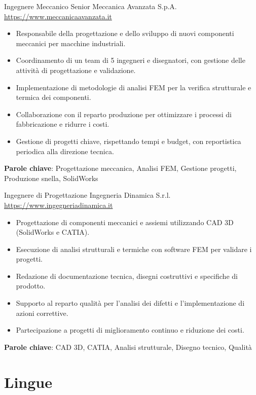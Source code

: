 \documentclass[a4paper, serif, 10pt]{moderncv}
\begin{document}
        {Ingegnere Meccanico Senior}
        {Meccanica Avanzata S.p.A.}
        {\url{https://www.meccanicaavanzata.it}}
        {}
        {\begin{itemize}
\item Responsabile della progettazione e dello sviluppo di nuovi componenti meccanici per macchine industriali.
\item Coordinamento di un team di 5 ingegneri e disegnatori, con gestione delle attività di progettazione e validazione.
\item Implementazione di metodologie di analisi FEM per la verifica strutturale e termica dei componenti.
\item Collaborazione con il reparto produzione per ottimizzare i processi di fabbricazione e ridurre i costi.
\item Gestione di progetti chiave, rispettando tempi e budget, con reportistica periodica alla direzione tecnica.
\end{itemize}
\textbf{Parole chiave}: Progettazione meccanica, Analisi FEM, Gestione progetti, Produzione snella, SolidWorks}

        {Ingegnere di Progettazione}
        {Ingegneria Dinamica S.r.l.}
        {\url{https://www.ingegneriadinamica.it}}
        {}
        {\begin{itemize}
\item Progettazione di componenti meccanici e assiemi utilizzando CAD 3D (SolidWorks e CATIA).
\item Esecuzione di analisi strutturali e termiche con software FEM per validare i progetti.
\item Redazione di documentazione tecnica, disegni costruttivi e specifiche di prodotto.
\item Supporto al reparto qualità per l'analisi dei difetti e l'implementazione di azioni correttive.
\item Partecipazione a progetti di miglioramento continuo e riduzione dei costi.
\end{itemize}
\textbf{Parole chiave}: CAD 3D, CATIA, Analisi strutturale, Disegno tecnico, Qualità}
\section{Lingue}

\end{document}
